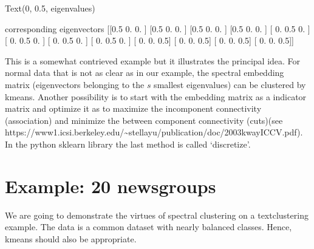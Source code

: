 \documentclass[letterpaper,10pt,english]{jupyterBook}
\begin{document}
\begin{sphinxVerbatim}[commandchars=\\\{\}]
Text(0, 0.5, \PYGZsq{}eigenvalues\PYGZsq{})
\end{sphinxVerbatim}

\noindent{}

\begin{sphinxVerbatim}[commandchars=\\\{\}]
\PYG{p}{[} \PYG{p}{]}
\end{sphinxVerbatim}

\begin{sphinxVerbatim}[commandchars=\\\{\}]
corresponding eigenvectors
[[\PYGZhy{}0.5  0.   0. ]
 [\PYGZhy{}0.5  0.   0. ]
 [\PYGZhy{}0.5  0.   0. ]
 [\PYGZhy{}0.5  0.   0. ]
 [ 0.  \PYGZhy{}0.5  0. ]
 [ 0.  \PYGZhy{}0.5  0. ]
 [ 0.  \PYGZhy{}0.5  0. ]
 [ 0.  \PYGZhy{}0.5  0. ]
 [ 0.   0.  \PYGZhy{}0.5]
 [ 0.   0.  \PYGZhy{}0.5]
 [ 0.   0.  \PYGZhy{}0.5]
 [ 0.   0.  \PYGZhy{}0.5]]
\end{sphinxVerbatim}

\sphinxAtStartPar
This is a somewhat contrieved example but it illustrates the principal idea.
For normal data that is not as clear as in our example, the spectral embedding matrix (eigenvectors belonging to the \(s\) smallest eigenvalues) can be clustered by k\sphinxhyphen{}means. Another possibility is to start with the embedding matrix as a indicator matrix and optimize it as to maximize the in\sphinxhyphen{}component connectivity (association) and minimize the between component connectivity (cuts)(see https://www1.icsi.berkeley.edu/\textasciitilde{}stellayu/publication/doc/2003kwayICCV.pdf). In the python sklearn library the last method is called ‘discretize’.


\section{Example: 20 newsgroups}
\label{\detokenize{Text_Clustering:example-20-newsgroups}}
\sphinxAtStartPar
We are going to demonstrate the virtues of spectral clustering on a text\sphinxhyphen{}clustering example. The data is a common dataset with nearly balanced classes. Hence, k\sphinxhyphen{}means should also be appropriate.
\end{document}
